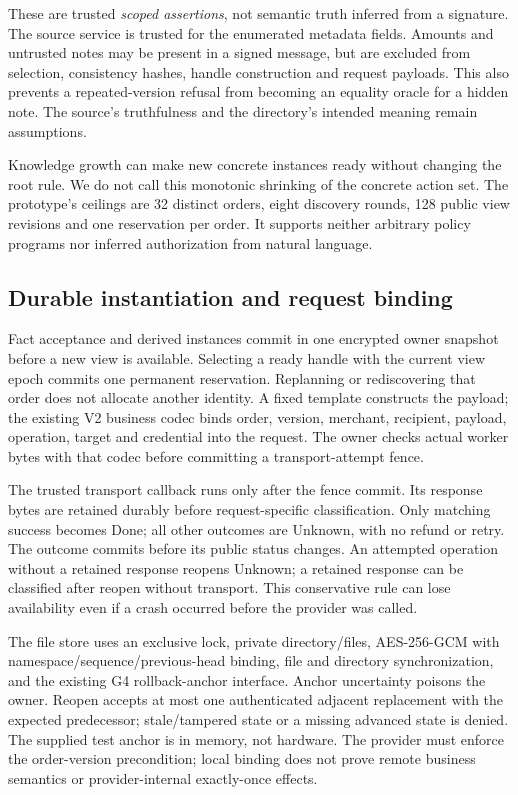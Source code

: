 \documentclass[letterpaper,twocolumn,10pt]{article}
\begin{document}
These are trusted \emph{scoped assertions}, not semantic truth inferred from a
signature. The source service is trusted for the enumerated metadata fields.
Amounts and untrusted notes may be present in a signed message, but are excluded
from selection, consistency hashes, handle construction and request payloads.
This also prevents a repeated-version refusal from becoming an equality oracle
for a hidden note. The source's truthfulness and the directory's intended
meaning remain assumptions.

Knowledge growth can make new concrete instances ready without changing the
root rule. We do not call this monotonic shrinking of the concrete action set.
The prototype's ceilings are 32 distinct orders, eight discovery rounds,
128 public view revisions and one reservation per order. It supports neither
arbitrary policy programs nor inferred authorization from natural language.

\subsection{Durable instantiation and request binding}

Fact acceptance and derived instances commit in one encrypted owner snapshot
before a new view is available. Selecting a ready handle with the current view
epoch commits one permanent reservation. Replanning or rediscovering that order
does not allocate another identity. A fixed template constructs the payload;
the existing V2 business codec binds order, version, merchant, recipient, payload,
operation, target and credential into the request. The owner checks actual
worker bytes with that codec before committing a transport-attempt fence.

The trusted transport callback runs only after the fence commit. Its response
bytes are retained durably before request-specific classification. Only matching
success becomes Done; all other outcomes are Unknown, with no refund or retry.
The outcome commits before its public status changes. An attempted operation
without a retained response reopens Unknown; a retained response can be classified
after reopen without transport. This conservative rule can lose availability
even if a crash occurred before the provider was called.

The file store uses an exclusive lock, private directory/files, AES-256-GCM with
namespace/sequence/previous-head binding, file and directory synchronization,
and the existing G4 rollback-anchor interface. Anchor uncertainty poisons the
owner. Reopen accepts at most one authenticated adjacent replacement with the
expected predecessor; stale/tampered state or a missing advanced state is denied.
The supplied test anchor is in memory, not hardware. The provider must enforce
the order-version precondition; local binding does not prove remote business
semantics or provider-internal exactly-once effects.
\end{document}
